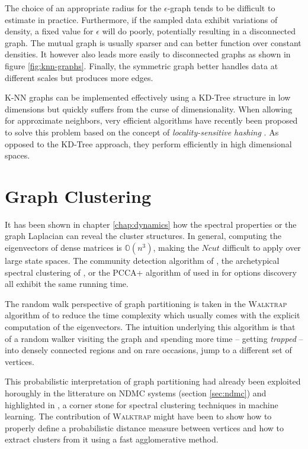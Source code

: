 \documentclass[12pt, oneside, extrafontsizes]{memoir}  %
\theoremstyle{plain}
\theoremstyle{definition}
\begin{document}
The choice of an appropriate radius for the $\epsilon$-graph tends to be difficult to estimate in practice. Furthermore, if the sampled data exhibit variations of density, a fixed value for $\epsilon$ will do poorly, potentially resulting in a disconnected graph. The mutual graph is usually sparser and can better function over constant densities. It however also leads more easily to  disconnected graphs as shown in figure \ref{fig:knn-graphs}. Finally, the symmetric graph better handles data at different scales but produces more edges.  

K-NN graphs can be implemented effectively using a KD-Tree \cite{Friedman1977}
structure in low dimensions but quickly suffers from the curse of dimensionality.
When allowing for approximate neighbors, very efficient algorithms have recently
been proposed to solve this problem based on the concept of \textit{locality-sensitive
hashing} \cite{Andoni2008}. As opposed to the KD-Tree approach, they perform
efficiently in high dimensional spaces. 

\section{Graph Clustering}
It has been shown in chapter \ref{chap:dynamics} how the spectral properties or the graph Laplacian can reveal the cluster structures. In general, computing the eigenvectors of dense matrices is $\mathbb{O}(n^3)$, making the $Ncut$ difficult to apply over large state spaces. The community detection algorithm of \cite{Newman2006}, the archetypical spectral clustering of \cite{Ng2001}, or the PCCA+ algorithm of \cite{Deuflhard2005} used in \cite{Mathew2012} for options discovery all exhibit the same running time.

The random walk perspective of graph partitioning is taken in the \textsc{Walktrap} algorithm of \cite{Pons2005} to reduce the time complexity which usually comes with the explicit computation of the eigenvectors. The intuition underlying this algorithm is that of a random walker visiting the graph and spending more time -- getting \textit{trapped} -- into densely connected regions and on rare occasions, jump to a different set of vertices.

This probabilistic interpretation of graph partitioning had already been exploited horoughly in the litterature on NDMC systems (section \ref{sec:ndmc}) and highlighted in \cite{Shi2001}, a corner stone for spectral clustering techniques in machine learning. The contribution of \textsc{Walktrap} might have been to show how to properly define a probabilistic distance measure between vertices and how to extract clusters from it using a fast agglomerative method.
\end{document}

